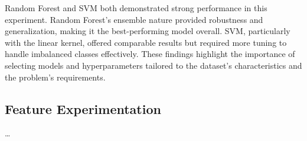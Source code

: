         Random Forest and SVM both demonstrated strong performance in this experiment. Random Forest's ensemble nature provided robustness and generalization, making it the best-performing model overall. SVM, particularly with the linear kernel, offered comparable results but required more tuning to handle imbalanced classes effectively. These findings highlight the importance of selecting models and hyperparameters tailored to the dataset's characteristics and the problem's requirements.

        
    \subsection{Feature Experimentation}
        
        \ldots %
        
        
        
        
        \clearpage

        
